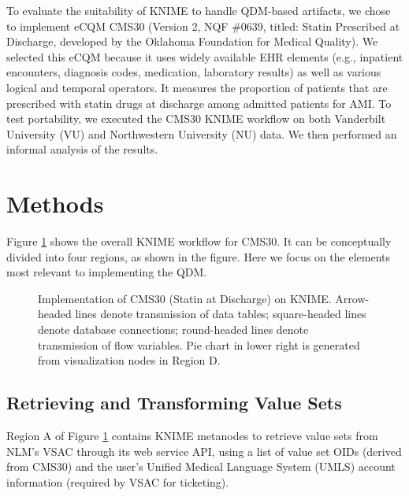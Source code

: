 \documentclass{article}
\begin{document}
To evaluate the suitability of KNIME to handle QDM-based artifacts, we chose to implement eCQM CMS30 (Version 2, NQF \#0639, titled: Statin Prescribed at Discharge\cite{krumholz_acc/aha_2008}, developed by the Oklahoma Foundation for Medical Quality). We selected this eCQM because it uses widely available EHR elements (e.g., inpatient encounters, diagnosis codes, medication, laboratory results) as well as various logical and temporal operators. It measures the proportion of patients that are prescribed with statin drugs at discharge among admitted patients for AMI. To test portability, we executed the CMS30 KNIME workflow on both Vanderbilt University (VU) and Northwestern University (NU) data. We then performed an informal analysis of the results.

\section{Methods}

Figure \ref{fig:knime-snapshot-1} shows the overall KNIME workflow for CMS30. It can be conceptually divided into four regions, as shown in the figure. Here we focus on the elements most relevant to implementing the QDM.

\begin{figure}
\centering
	\caption{Implementation of CMS30 (Statin at Discharge) on KNIME. Arrow-headed lines denote transmission of data tables; square-headed lines denote database connections; round-headed lines denote transmission of flow variables. Pie chart in lower right is generated from visualization nodes in Region D.
	}\label{fig:knime-snapshot-1}
\end{figure}

\subsection{Retrieving and Transforming Value Sets}

Region A of Figure \ref{fig:knime-snapshot-1} contains KNIME metanodes to retrieve value sets from NLM's VSAC through its web service API, using a list of value set OIDs (derived from CMS30) and the user's Unified Medical Language System (UMLS) account information (required by VSAC for ticketing).
\end{document}
